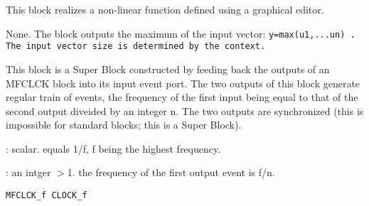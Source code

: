 %
%


\label{LOOKUPf}

This block realizes a non-linear function defined using a graphical
editor. 





%
%


\label{MAXf}

None.
The block outputs the maximum of the input vector:
%
\tt y=max(u1,...un)%
\rm .
The input vector size is determined by the context.

%
%


\label{MCLOCKf}

This block is a Super Block constructed by feeding back the outputs
of an MFCLCK block into its input event port. The two
outputs of this block generate regular train of events, the frequency
of the first input being equal to that of the second output diveided
by an integer n. The two outputs are synchronized (this is impossible
for standard blocks; this is a Super Block).
\begin{scitem}
\item[{\verb?Basic period?}]
: scalar. equals 1/f, f being the highest frequency.
\item[{\verb?n ?}]
: an intger $>$1. the frequency of the first output event is f/n.
\end{scitem}%
{\verb?MFCLCK_f CLOCK_f?} \pageref{MFCLCKfCLOCKf}







%
%


\label{MFCLCKf}

